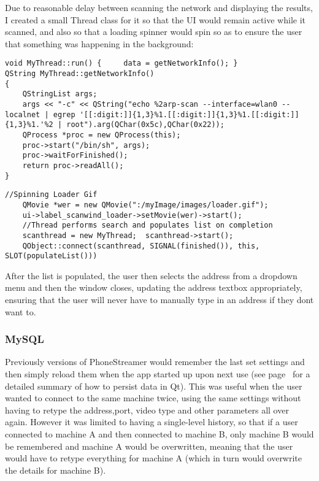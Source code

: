 \documentclass[11pt]{article} %
\begin{document}
Due to reasonable delay between scanning the network and displaying the results, I created a small Thread class for it so that the UI would remain active while it scanned, and also so that a loading spinner would spin so as to ensure the user that something was happening in the background:
\vspace{-15pt}
\begin{lstlisting}[title=\bf Snippet from MyThread.cpp for Scanning network and Retrieving data]
void MyThread::run() {     data = getNetworkInfo(); }
QString MyThread::getNetworkInfo()
{
    QStringList args;
    args << "-c" << QString("echo %2arp-scan --interface=wlan0 --localnet | egrep '[[:digit:]]{1,3}%1.[[:digit:]]{1,3}%1.[[:digit:]]{1,3}%1.'%2 | root").arg(QChar(0x5c),QChar(0x22));
    QProcess *proc = new QProcess(this);
    proc->start("/bin/sh", args);
    proc->waitForFinished();
    return proc->readAll();
}
\end{lstlisting}
\vspace{-20pt}
\begin{lstlisting}[title=\bf Snippet from ScanWind.cpp which calls MyThread]
    //Spinning Loader Gif
    QMovie *wer = new QMovie(":/myImage/images/loader.gif");
    ui->label_scanwind_loader->setMovie(wer)->start();
    //Thread performs search and populates list on completion
    scanthread = new MyThread;  scanthread->start();
    QObject::connect(scanthread, SIGNAL(finished()), this, SLOT(populateList()))
\end{lstlisting}

After the list is populated, the user then selects the address from a dropdown menu and then the window closes, updating the address textbox appropriately, ensuring that the user will never have to manually type in an address if they dont want to.


\subsubsection{MySQL}
Previously versions of PhoneStreamer would remember the last set settings and then simply reload them when the app started up upon next use (see page~\pageref{QSettings} for a detailed summary of how to persist data in Qt). This was useful when the user wanted to connect to the same machine twice, using the same settings without having to retype the address,port, video type and other parameters all over again. However it was limited to having a single-level history, so that if a user connected to machine A and then connected to machine B, only machine B would be remembered and machine A would be overwritten, meaning that the user would have to retype everything for machine A (which in turn would overwrite the details for machine B).
\end{document}
